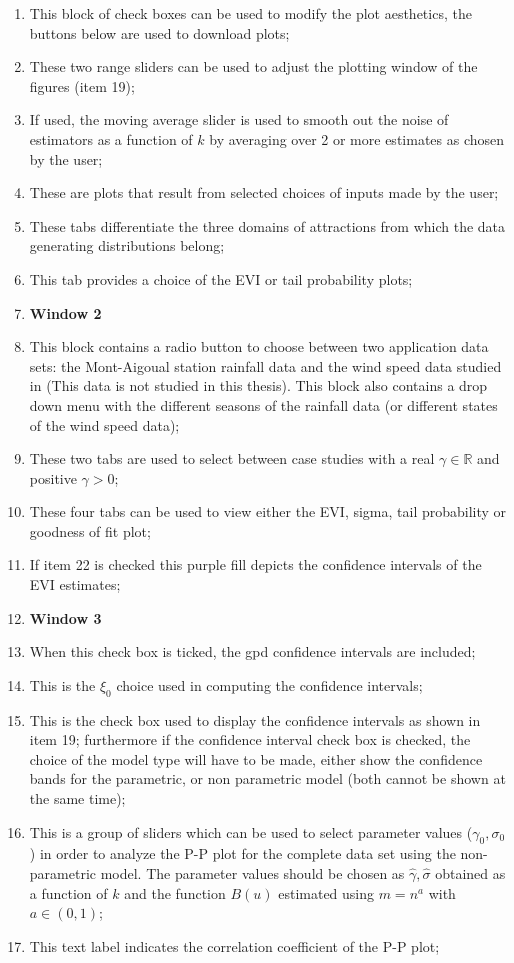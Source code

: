 \begin{subappendices}
\begin{enumerate}
    \item This block of check boxes can be used to modify the plot aesthetics, the buttons below are used to download plots;
    \item These two range sliders can be used to adjust the plotting window of the figures (item 19);
    \item If used, the moving average slider is used to smooth out the noise of estimators as a function of $k$ by averaging over 2 or more estimates as chosen by the user;
    \item These are plots that result from selected choices of inputs made by the user;
    \item These tabs differentiate the three domains of attractions from which the data generating distributions belong;
    \item This tab provides a choice of the EVI or tail probability plots;
    \item[] {\large \textbf{Window 2}}
    \item This block contains a radio button to choose between two application data sets: the Mont-Aigoual station rainfall data and the wind speed data studied in \cite{sts626} (This data is not studied in this thesis). This block also contains a drop down menu with the different seasons of the rainfall data (or different states of the wind speed data);
    \item These two tabs are used to select between case studies with a real $\gamma\in \mathbb{R}$ and positive $\gamma >0$;
    \item These four tabs can be used to view either the EVI, sigma, tail probability or goodness of fit plot;
    \item If item 22 is checked this purple fill depicts the confidence intervals of the EVI estimates;
    \item[] {\large \textbf{Window 3}}
    \item When this check box is ticked, the gpd confidence intervals are included; 
    \item This is the $\xi_0$ choice used in computing the confidence intervals;
    \item This is the check box used to display the confidence intervals as shown in item 19; furthermore if the confidence interval check box is checked, the choice of the model type will have to be made, either show the confidence bands for the parametric, or non parametric model (both cannot be shown at the same time);
    \item This is a group of sliders which can be used to select parameter values ($\gamma_0,\sigma_0$) in order to analyze the P-P plot for the complete data set using the non-parametric model. The parameter values should be chosen as $\hat{\gamma}, \hat{\sigma}$ obtained as a function of $k$ and the function $B(u)$ estimated using $m=n^a$ with $a\in (0,1)$;
    \item This text label indicates the correlation coefficient of the P-P plot;



\end{enumerate}
\end{subappendices}
